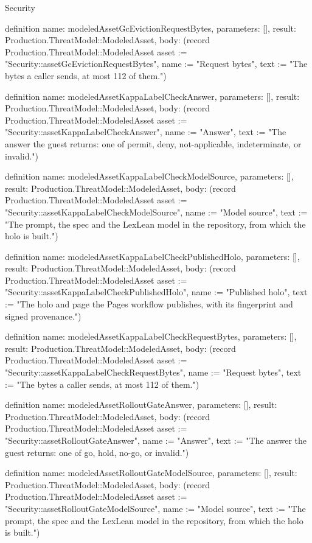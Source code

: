 \begin{lexlean}{Security}
\begin{semanticmodule}
definition{
  name: modeledAssetGcEvictionRequestBytes,
  parameters: [],
  result: Production.ThreatModel::ModeledAsset,
  body: (record Production.ThreatModel::ModeledAsset {asset := "Security::assetGcEvictionRequestBytes", name := "Request bytes", text := "The bytes a caller sends, at most 112 of them."})
}

definition{
  name: modeledAssetKappaLabelCheckAnswer,
  parameters: [],
  result: Production.ThreatModel::ModeledAsset,
  body: (record Production.ThreatModel::ModeledAsset {asset := "Security::assetKappaLabelCheckAnswer", name := "Answer", text := "The answer the guest returns: one of permit, deny, not-applicable, indeterminate, or invalid."})
}

definition{
  name: modeledAssetKappaLabelCheckModelSource,
  parameters: [],
  result: Production.ThreatModel::ModeledAsset,
  body: (record Production.ThreatModel::ModeledAsset {asset := "Security::assetKappaLabelCheckModelSource", name := "Model source", text := "The prompt, the spec and the LexLean model in the repository, from which the holo is built."})
}

definition{
  name: modeledAssetKappaLabelCheckPublishedHolo,
  parameters: [],
  result: Production.ThreatModel::ModeledAsset,
  body: (record Production.ThreatModel::ModeledAsset {asset := "Security::assetKappaLabelCheckPublishedHolo", name := "Published holo", text := "The holo and page the Pages workflow publishes, with its fingerprint and signed provenance."})
}

definition{
  name: modeledAssetKappaLabelCheckRequestBytes,
  parameters: [],
  result: Production.ThreatModel::ModeledAsset,
  body: (record Production.ThreatModel::ModeledAsset {asset := "Security::assetKappaLabelCheckRequestBytes", name := "Request bytes", text := "The bytes a caller sends, at most 112 of them."})
}

definition{
  name: modeledAssetRolloutGateAnswer,
  parameters: [],
  result: Production.ThreatModel::ModeledAsset,
  body: (record Production.ThreatModel::ModeledAsset {asset := "Security::assetRolloutGateAnswer", name := "Answer", text := "The answer the guest returns: one of go, hold, no-go, or invalid."})
}

definition{
  name: modeledAssetRolloutGateModelSource,
  parameters: [],
  result: Production.ThreatModel::ModeledAsset,
  body: (record Production.ThreatModel::ModeledAsset {asset := "Security::assetRolloutGateModelSource", name := "Model source", text := "The prompt, the spec and the LexLean model in the repository, from which the holo is built."})
}


\end{semanticmodule}
\end{lexlean}
